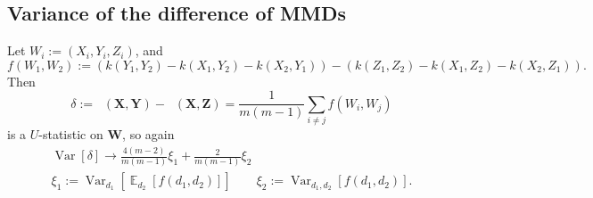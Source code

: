 \documentclass{article}
\DeclareMathOperator{\E}{\mathbb{E}}
\DeclareMathOperator{\Var}{Var}
\DeclareMathOperator{\mmdsqu}{\widehat{MMD}_U^2}
\newcommand{\setX}{\mathbf{X}}
\newcommand{\setY}{\mathbf{Y}}
\newcommand{\setZ}{\mathbf{Z}}
\newcommand{\setW}{\mathbf{W}}
\begin{document}
\subsection{Variance of the difference of MMDs} \label{sec:diff-expression}

Let $W_i := (X_i, Y_i, Z_i)$, and
\[
f(W_1, W_2) := 
\left( k(Y_1, Y_2) - k(X_1, Y_2) - k(X_2, Y_1) \right)
- \left( k(Z_1, Z_2) - k(X_1, Z_2) - k(X_2, Z_1) \right)
.\]
Then
\[
  \delta
  := \mmdsqu(\setX, \setY) - \mmdsqu(\setX, \setZ)
  = \frac{1}{m (m-1)} \sum_{i \ne j} f(W_i, W_j)
\]
is a $U$-statistic on $\setW$, so again
\begin{gather*}
  \Var[\delta]
  \to \frac{4 (m-2)}{m (m-1)} \xi_1 + \frac{2}{m (m-1)} \xi_2
\\
  \xi_1 := \Var_{d_1}\left[ \E_{d_2}\left[ f(d_1, d_2) \right] \right]
  \qquad
  \xi_2 := \Var_{d_1, d_2}\left[ f(d_1, d_2) \right]
.\end{gather*}
\end{document}
